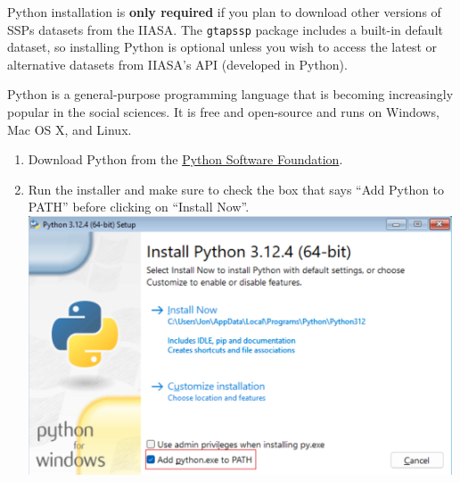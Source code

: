 \documentclass[
  letterpaper,
  DIV=11,
  numbers=noendperiod]{scrartcl}
\begin{document}
\begin{tcolorbox}[enhanced jigsaw, colback=white, coltitle=black, toprule=.15mm, opacitybacktitle=0.6, title=\textcolor{quarto-callout-tip-color}{\faLightbulb}\hspace{0.5em}{Python install details}, bottomrule=.15mm, toptitle=1mm, breakable, bottomtitle=1mm, colbacktitle=quarto-callout-tip-color!10!white, opacityback=0, colframe=quarto-callout-tip-color-frame, arc=.35mm, titlerule=0mm, rightrule=.15mm, leftrule=.75mm, left=2mm]

\begin{tcolorbox}[enhanced jigsaw, colback=white, coltitle=black, toprule=.15mm, opacitybacktitle=0.6, title=\textcolor{quarto-callout-important-color}{\faExclamation}\hspace{0.5em}{Important}, bottomrule=.15mm, toptitle=1mm, breakable, bottomtitle=1mm, colbacktitle=quarto-callout-important-color!10!white, opacityback=0, colframe=quarto-callout-important-color-frame, arc=.35mm, titlerule=0mm, rightrule=.15mm, leftrule=.75mm, left=2mm]

Python installation is \textbf{only required} if you plan to download
other versions of SSPs datasets from the IIASA. The \texttt{gtapssp}
package includes a built-in default dataset, so installing Python is
optional unless you wish to access the latest or alternative datasets
from IIASA's API (developed in Python).

\end{tcolorbox}

Python is a general-purpose programming language that is becoming
increasingly popular in the social sciences. It is free and open-source
and runs on Windows, Mac OS X, and Linux.

\begin{enumerate}
\def\labelenumi{\arabic{enumi}.}
\item
  Download Python from the
  \href{https://www.python.org/downloads/}{Python Software Foundation}.
\item
  Run the installer and make sure to check the box that says ``Add
  Python to PATH'' before clicking on ``Install Now''.\\
  \includegraphics[width=4.94792in,height=\textheight]{images/clipboard-1705657641.png}
\end{enumerate}

\end{tcolorbox}
\end{document}
